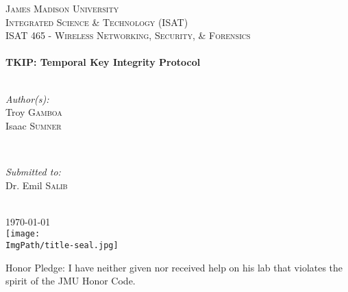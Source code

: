\documentclass[main.tex]{subfiles}
\begin{document}
\begin{titlepage}

\center

\textsc{\LARGE{James Madison University}}
\\[0.5cm] 
\textsc{\Large{Integrated Science \& Technology (ISAT)}}
\\[0.4cm]
\textsc{\large ISAT 465 - Wireless Networking, Security, \& Forensics}
\\[0.4cm]

\HRule
\\[0.35cm]
\Large {\bfseries TKIP: Temporal Key Integrity Protocol }
\\[0.35cm] 
\HRule 
\\[0.5cm]

\begin{minipage}{0.4\textwidth}
\begin{flushleft} \large
\emph{Author(s):}\\

Troy \textsc{Gamboa}\\ 
Isaac \textsc{Sumner}\\
\end{flushleft}
\end{minipage}
~
\begin{minipage}{0.4\textwidth}
\begin{flushright} \large
\emph{Submitted to:} \\

Dr. Emil \textsc{Salib} 
\end{flushright}
\end{minipage}
\\[0.5cm]

{\large \today}
\\[0.5cm] 

\texttt{[image: \\ImgPath/title-seal.jpg]}
\\[0.4cm] 

\begin{flushleft} Honor Pledge: I have neither given nor received help on his lab that violates the spirit of the JMU Honor Code.
\\[0.5cm]
\end{flushleft}


\begin{adjustbox}{width=1.2\textwidth,center=\textwidth}


\end{adjustbox}

\end{titlepage}
\end{document}
